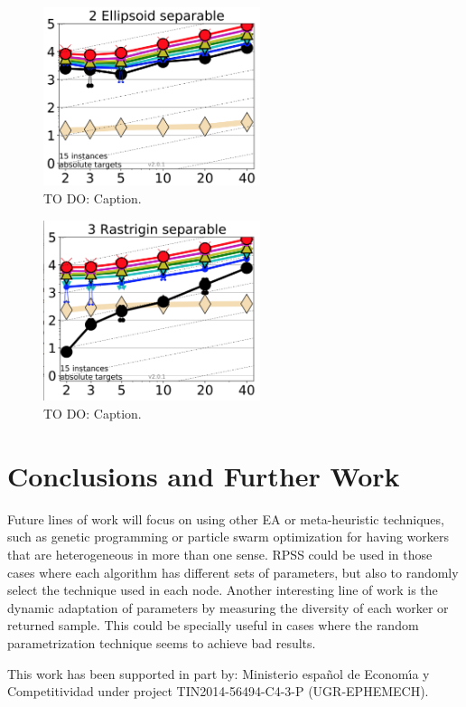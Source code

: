 \begin{figure}[!t]
    \centering
        \includegraphics[width=2.5in]{img/Ellipsoid.png}
    \caption{ TO DO: Caption.}
    \label{fig:ellipsoid}
\end{figure}

\begin{figure}[!t]
    \centering
        \includegraphics[width=2.5in]{img/Rastrigin.png}
    \caption{ TO DO: Caption.}
    \label{fig:rastrigin}
\end{figure}


\section{Conclusions and Further Work}
\label{sec:conclusions}


Future lines of work will focus on using other EA or meta-heuristic techniques, 
such as genetic programming or particle swarm optimization for having 
workers that are heterogeneous in more than one sense. RPSS could be
used in those cases where each algorithm has different sets of
parameters, but also to randomly select the technique used in each
node. Another interesting line of work is the dynamic adaptation of
parameters by measuring the diversity of each worker or returned
sample. This could be specially useful in cases where the random
parametrization technique seems to achieve bad results. 

\begin{acks}
This work has been supported in part by:  Ministerio espa\~{n}ol de
Econom\'{\i}a y Competitividad under project TIN2014-56494-C4-3-P
(UGR-EPHEMECH).
\end{acks}
